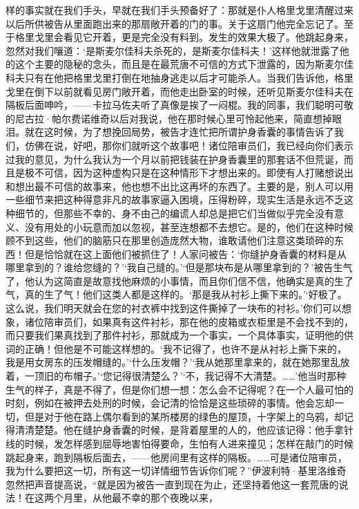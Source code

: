 样的事实就在我们手头，早就在我们手头预备好了：那就是仆人格里戈里清醒过来以后所供被告从里面跑出来的那扇敞开着的门的事。关于这扇门他完全忘记了。至于格里戈里会看见它开着，更是完全没有料到。发生的效果大极了。他跳起身来，忽然对我们嚷道：‘是斯麦尔佳科夫杀死的，是斯麦尔佳科夫！’这样他就泄露了他的这个主要的隐秘的念头，而且是在最荒唐不可信的方式下泄露的，因为斯麦尔佳科夫只有在他把格里戈里打倒在地抽身逃走以后才可能杀人。当我们告诉他，格里戈里在倒下以前就看见房门敞开着，而他走出卧室的时候，还听见斯麦尔佳科夫在隔板后面呻吟，——卡拉马佐夫听了真像是挨了一闷棍。我的同事，我们聪明可敬的尼古拉·帕尔费诺维奇以后对我说，他在那时候心里可怜起他来，简直想掉眼泪。就在这时候，为了想挽回局势，被告才连忙把所谓护身香囊的事情告诉了我们，仿佛在说，好吧，那你们就听这个故事吧！诸位陪审员们，我已经向你们表示过我的意见，为什么我认为一个月以前把钱装在护身香囊里的那套话不但荒诞，而且是极不可信，因为这种虚构只是在这种情形下才想出来的。即使有人打赌想说出和想出最不可信的故事来，他也想不出比这再坏的东西了。主要的是，别人可以用一些细节来把这种得意非凡的故事家逼入困境，压得粉碎，现实生活是永远不乏这种细节的，但那些不幸的、身不由己的编谎人却总是把它们当做似乎完全没有意义、没有用处的小玩意而加以忽视，甚至连想都不去想它。是的，他们在这种时候顾不到这些，他们的脑筋只在那里创造庞然大物，谁敢请他们注意这类琐碎的东西！但是恰恰就在这上面他们被抓住了！人家问被告：‘你缝护身香囊的材料是从哪里拿到的？谁给您缝的？’‘我自己缝的。’‘但是那块布是从哪里拿到的？’被告生气了，他认为这简直是故意找他麻烦的小事情，而且你们信不信，他确实是真的生了气，真的生了气！他们这类人都是这样的。‘那是我从衬衫上撕下来的。’‘好极了。这么说，我们明天就会在您的衬衣裤中找到这件撕掉了一块布的衬衫。’你们可以想象，诸位陪审员们，如果真有这件衬衫，那在他的皮箱或衣柜里是不会找不到的，而只要我们果真找到了那件衬衫，那就成为一个事实，一个具体事实，证明他的供词的正确！但他是不可能这样想的。‘我不记得了，也许不是从衬衫上撕下来的，我是用女房东的压发帽缝的。’‘什么压发帽？’‘我从她那里拿来的，就在她那里乱放着，一顶旧的布帽子。’‘您记得很清楚么？’‘不，我记得不大清楚。……’他当时那种生气的样子，真是不得了，但是你们想一想：怎么会不记得呢？在一个人最可怕的时刻，例如在被押去处刑的时候，会记清的恰恰是这些琐碎的事情。他会忘却一切，但是对于他在路上偶尔看到的某所楼房的绿色的屋顶，十字架上的乌鸦，却记得清清楚楚。他在缝护身香囊的时候，是背着屋里的人的，他应该记得：他手拿针线的时候，发怎样感到屈辱地害怕得要命，生怕有人进来撞见；怎样在敲门的时候跳起身来，跑到隔板后面去，——他房间里有这样的隔板。……可是诸位陪审员，我为什么要把这一切，所有这一切详情细节告诉你们呢？”伊波利特·基里洛维奇忽然把声音提高说，“就是因为被告一直到现在为止，还坚持着他这一套荒唐的说法！在这两个月里，从他最不幸的那个夜晚以来，